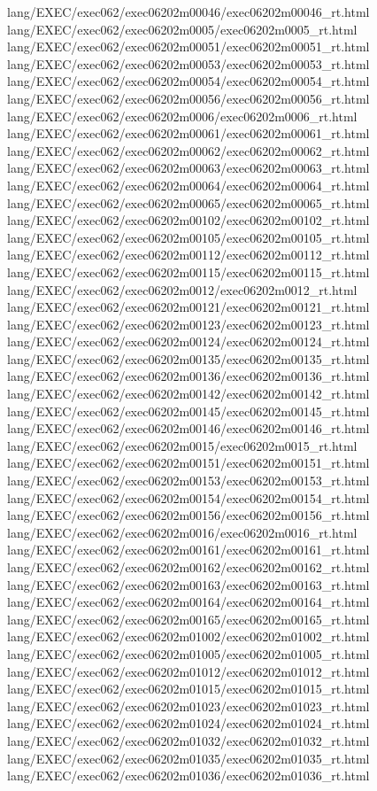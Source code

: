 lang/EXEC/exec062/exec06202m00046/exec06202m00046_rt.html
lang/EXEC/exec062/exec06202m0005/exec06202m0005_rt.html
lang/EXEC/exec062/exec06202m00051/exec06202m00051_rt.html
lang/EXEC/exec062/exec06202m00053/exec06202m00053_rt.html
lang/EXEC/exec062/exec06202m00054/exec06202m00054_rt.html
lang/EXEC/exec062/exec06202m00056/exec06202m00056_rt.html
lang/EXEC/exec062/exec06202m0006/exec06202m0006_rt.html
lang/EXEC/exec062/exec06202m00061/exec06202m00061_rt.html
lang/EXEC/exec062/exec06202m00062/exec06202m00062_rt.html
lang/EXEC/exec062/exec06202m00063/exec06202m00063_rt.html
lang/EXEC/exec062/exec06202m00064/exec06202m00064_rt.html
lang/EXEC/exec062/exec06202m00065/exec06202m00065_rt.html
lang/EXEC/exec062/exec06202m00102/exec06202m00102_rt.html
lang/EXEC/exec062/exec06202m00105/exec06202m00105_rt.html
lang/EXEC/exec062/exec06202m00112/exec06202m00112_rt.html
lang/EXEC/exec062/exec06202m00115/exec06202m00115_rt.html
lang/EXEC/exec062/exec06202m0012/exec06202m0012_rt.html
lang/EXEC/exec062/exec06202m00121/exec06202m00121_rt.html
lang/EXEC/exec062/exec06202m00123/exec06202m00123_rt.html
lang/EXEC/exec062/exec06202m00124/exec06202m00124_rt.html
lang/EXEC/exec062/exec06202m00135/exec06202m00135_rt.html
lang/EXEC/exec062/exec06202m00136/exec06202m00136_rt.html
lang/EXEC/exec062/exec06202m00142/exec06202m00142_rt.html
lang/EXEC/exec062/exec06202m00145/exec06202m00145_rt.html
lang/EXEC/exec062/exec06202m00146/exec06202m00146_rt.html
lang/EXEC/exec062/exec06202m0015/exec06202m0015_rt.html
lang/EXEC/exec062/exec06202m00151/exec06202m00151_rt.html
lang/EXEC/exec062/exec06202m00153/exec06202m00153_rt.html
lang/EXEC/exec062/exec06202m00154/exec06202m00154_rt.html
lang/EXEC/exec062/exec06202m00156/exec06202m00156_rt.html
lang/EXEC/exec062/exec06202m0016/exec06202m0016_rt.html
lang/EXEC/exec062/exec06202m00161/exec06202m00161_rt.html
lang/EXEC/exec062/exec06202m00162/exec06202m00162_rt.html
lang/EXEC/exec062/exec06202m00163/exec06202m00163_rt.html
lang/EXEC/exec062/exec06202m00164/exec06202m00164_rt.html
lang/EXEC/exec062/exec06202m00165/exec06202m00165_rt.html
lang/EXEC/exec062/exec06202m01002/exec06202m01002_rt.html
lang/EXEC/exec062/exec06202m01005/exec06202m01005_rt.html
lang/EXEC/exec062/exec06202m01012/exec06202m01012_rt.html
lang/EXEC/exec062/exec06202m01015/exec06202m01015_rt.html
lang/EXEC/exec062/exec06202m01023/exec06202m01023_rt.html
lang/EXEC/exec062/exec06202m01024/exec06202m01024_rt.html
lang/EXEC/exec062/exec06202m01032/exec06202m01032_rt.html
lang/EXEC/exec062/exec06202m01035/exec06202m01035_rt.html
lang/EXEC/exec062/exec06202m01036/exec06202m01036_rt.html

